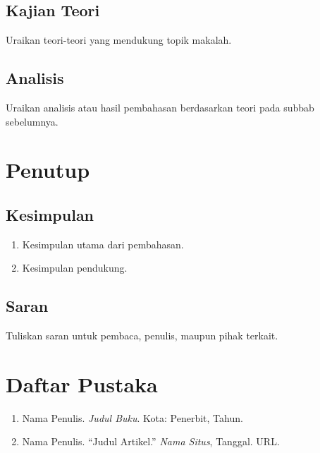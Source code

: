\documentclass[12pt,a4paper]{article}
\begin{document}
\subsection{Kajian Teori}
Uraikan teori-teori yang mendukung topik makalah.

\subsection{Analisis}
Uraikan analisis atau hasil pembahasan berdasarkan teori pada subbab sebelumnya.

\section{Penutup}
\subsection{Kesimpulan}
\begin{enumerate}[label=\arabic*., leftmargin=*]
  \item Kesimpulan utama dari pembahasan.
  \item Kesimpulan pendukung.
\end{enumerate}

\subsection{Saran}
Tuliskan saran untuk pembaca, penulis, maupun pihak terkait.

\newpage
\section*{Daftar Pustaka}
\begin{enumerate}[label={}, leftmargin=*]
  \item Nama Penulis. \textit{Judul Buku}. Kota: Penerbit, Tahun.
  \item Nama Penulis. ``Judul Artikel.'' \textit{Nama Situs}, Tanggal. URL.
\end{enumerate}
\end{document}
